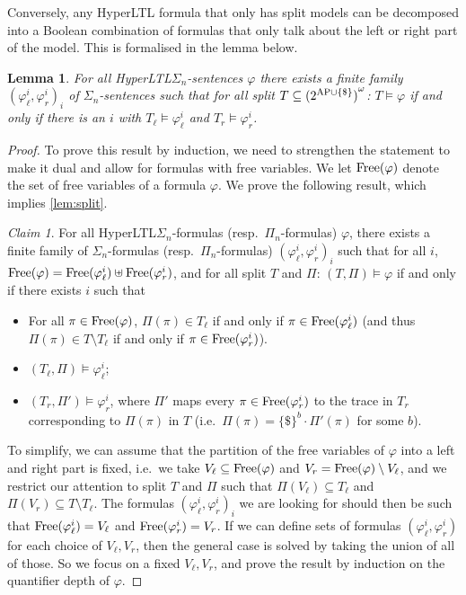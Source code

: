 \documentclass[dvipsnames,10pt,a4paper]{amsart}
\newtheorem{lem}[thm]{Lemma}
\theoremstyle{definition}
\theoremstyle{remark}
\newtheorem{clm}{Claim}
\newcommand{\set}[1]{\{#1\}}
\newcommand{\hyltl}{{HyperLTL}\xspace}
\newcommand\AP{\textup{AP}}
\newcommand\Free{\textup{Free}}
\newcommand\Pin[1]{\Pi_{#1}}
\newcommand\Tl{T_\ell}
\newcommand\Tr {T_r}
\newcommand\Vl{V_\ell}
\newcommand\Vr{V_r}
\begin{document}
Conversely, any \hyltl formula that only has split models can be decomposed
into a Boolean combination of formulas that only talk about the left or right
part of the model. This is formalised in the lemma below.

\begin{lem}\label{lem:split}
  For all \hyltl $\Sigma_n$-sentences $\varphi$
  there exists a finite family $(\varphi^i_\ell, \varphi^i_r)_i$ of $\Sigma_n$-sentences 
  such that for all 
  split $T \subseteq {(2^{\AP\cup \{\$\}})}^\omega$: 
  $T \models \varphi$ if and only if there is an $i$ with
  $\Tl \models \varphi^i_\ell$ and $\Tr  \models \varphi^i_r$.
\end{lem}

\begin{proof}
  To prove this result by induction, we need to strengthen the statement to make it dual and allow for formulas with free variables.
  We let $\Free(\varphi)$ denote the set of free variables of a formula
  $\varphi$. 
  We prove the following result, which implies \autoref{lem:split}.

\begin{clm}\label{lem:splitgen}
  For all \hyltl $\Sigma_n$-formulas (resp.\ $\Pin n$-formulas) $\varphi$,
  there exists a finite family of $\Sigma_n$-formulas
  (resp.\ $\Pi_n$-formulas)
  $(\varphi^i_\ell, \varphi^i_r)_{i}$
  such that for all $i$,
  $\Free(\varphi) = \Free(\varphi^i_\ell) \uplus \Free(\varphi^i_r)$,
  and for all split $T$ and $\Pi$: $(T, \Pi) \models \varphi$
  if and only if there exists $i$ such that
  \begin{itemize}
  \item For all $\pi \in \Free(\varphi)$, $\Pi(\pi) \in \Tl$ if and only if
    $\pi \in \Free(\varphi^i_{\ell})$
    (and thus $\Pi(\pi) \in T \setminus \Tl$ if and only if
    $\pi \in \Free(\varphi^i_{r})$).
  \item $(\Tl, \Pi) \models \varphi^i_\ell$;
  \item $(\Tr , \Pi') \models \varphi^i_r$,
    where $\Pi'$ maps every $\pi \in \Free(\varphi^i_r)$ to the trace in
    $\Tr $ corresponding to $\Pi(\pi)$ in $T$
    (i.e.\ $\Pi(\pi) = \set{\$}^b \cdot \Pi'(\pi)$ for some $b$).
  \end{itemize}
\end{clm}

  To simplify, we can assume that the partition of the free variables of
  $\varphi$ into a left and right part is fixed, i.e.\
  we take $\Vl \subseteq \Free(\varphi)$
  and $\Vr = \Free(\varphi) \setminus \Vl$, and we restrict our attention
  to split $T$ and $\Pi$ such that $\Pi(\Vl) \subseteq \Tl$
  and $\Pi(\Vr) \subseteq T \setminus \Tl$.
  The formulas $(\varphi^i_\ell, \varphi^i_r)_{i}$ we are looking
  for should then be such that $\Free(\varphi^i_\ell) = \Vl$ and
  $\Free(\varphi^i_r) = \Vr$.
  If we can define sets of formulas $(\varphi^i_\ell, \varphi^i_r)$ for each
  choice of $\Vl, \Vr$, then the general case is solved by taking the union
  of all of those.
  So we focus on a fixed $\Vl,\Vr$, and prove the result by induction on
  the quantifier depth of $\varphi$.
  

\end{proof}
\end{document}
